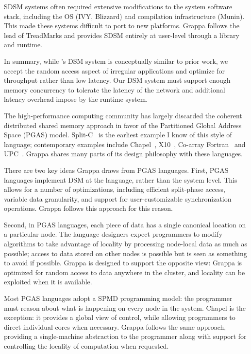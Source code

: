 SDSM systems often required extensive modifications to the system
software stack, including the OS (IVY, Blizzard) and compilation
infrastructure (Munin). This made these systems difficult to port to
new platforms. Grappa follows the lead of TreadMarks and provides
SDSM entirely at user-level through a library and runtime.

In summary, while \Grappa's DSM system is conceptually similar to prior work,
we accept the random access aspect of irregular applications and optimize for
throughput rather than low latency. Our DSM system must support enough memory
concurrency to tolerate the latency of the network and additional latency
overhead impose by the runtime system.

\vspace{0.5ex}
The high-performance computing community has largely discarded the
coherent distributed shared memory approach in favor of the
Partitioned Global Address Space (PGAS)
model. Split-C~\cite{Krishnamurthy:1993:PPS:169627.169724} is the
earliest example I know of this style of language; contemporary
examples include Chapel~\cite{Chamberlain:2007}, X10~\cite{X10:2005},
Co-array Fortran~\cite{Numrich:1998:CFP:289918.289920} and
UPC~\cite{upc:2005}. Grappa shares many parts of its design philosophy
with these languages.

There are two key ideas Grappa draws from PGAS languages. First, PGAS
languages implement DSM at the language, rather than the system
level. This allows for a number of optimizations, including efficient
split-phase access, variable data granularity, and support for
user-customizable synchronization operations. Grappa follows this
approach for this reason.

Second, in PGAS languages, each piece of data has a single canonical
location on a particular node. The language designers expect
programmers to modify algorithms to take advantage of locality by
processing node-local data as much as possible; access to data stored
on other nodes is possible but is seen as something to avoid if
possible. Grappa is designed to support the opposite view: Grappa is
optimized for random access to data anywhere in the cluster, and
locality can be exploited when it is available.

Most PGAS languages adopt a SPMD programming model: the programmer
must reason about what is happening on every node in the
system. Chapel is the exception: it provides a global view of control,
while allowing programmers to direct individual cores when
necessary. Grappa follows the same approach, providing a
single-machine abstraction to the programmer along with support for
controlling the locality of computation when requested.



